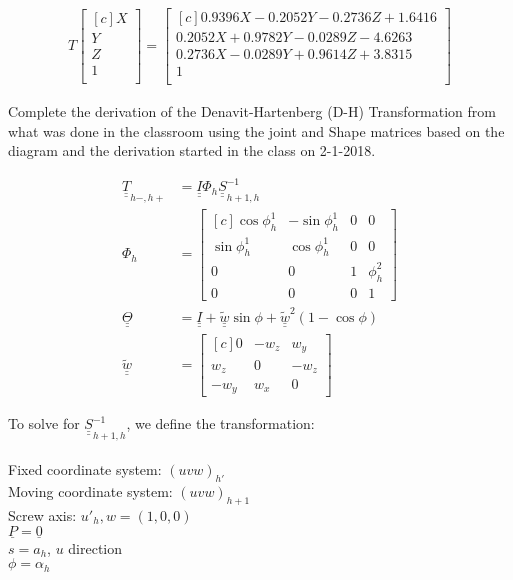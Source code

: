\documentclass[onecolumn,10pt]{jhwhw}
\def\du#1{\underline{\underline{#1}}}
\begin{document}
\begin{align*}
T
\begin{bmatrix*}[c]
X \\
Y \\
Z \\
1 \\
\end{bmatrix*}
=
\begin{bmatrix*}[c]
0.9396 X -  0.2052 Y -  0.2736 Z +  1.6416 \\
0.2052 X +  0.9782 Y -  0.0289 Z -  4.6263 \\
0.2736 X -  0.0289 Y +  0.9614 Z +  3.8315 \\
                                         1 \\
\end{bmatrix*}
\end{align*}


\problem{}
Complete the derivation of the Denavit-Hartenberg (D-H) Transformation from what was done in the classroom using the joint and Shape matrices based on the diagram and the derivation started in the class on 2-1-2018.

\begin{align*}
\du{T}_{h-, h+} &= \du{I} \Phi_{h} \du{S}^{-1}_{h+1, h} \\
\Phi_{h} &=
\begin{bmatrix*}[c]
\cos \phi_h^1 & -\sin \phi_h^1 & 0 & 0 \\
\sin \phi_h^1 &  \cos \phi_h^1 & 0 & 0 \\
0 & 0 & 1 & \phi_h^2 \\
0 & 0 & 0 & 1
\end{bmatrix*} \\
\du{\Theta} &= \du{I} + \du{\widetilde{w}} \sin \phi + \du{\widetilde{w}}^2 \left ( 1 - \cos\phi \right ) \\
\du{\widetilde{w}} &= 
\begin{bmatrix*}[c]
0 & -w_z & w_y \\
w_z & 0 & -w_z \\
-w_y & w_x & 0
\end{bmatrix*} 
\end{align*}

To solve for $\du{S}^{-1}_{h+1, h}$, we define the transformation: \\
\\
Fixed coordinate system: $(u v w)_{h'}$ \\
Moving coordinate system: $(u v w)_{h+1}$ \\
Screw axis: $u'_h, w = (1, 0, 0)$ \\
$\underline{P} = \underline{0}$ \\
$s = a_h$, $u$ direction \\
$\phi = \alpha_h$
\end{document}
